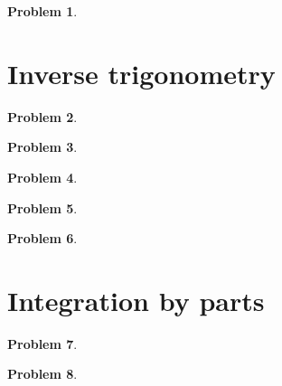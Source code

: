 \documentclass{article}
\newtheorem{problem}{Problem}
\begin{document}
\begin{problem}

\end{problem}
\section{Inverse trigonometry}
\begin{problem}

\end{problem}


\begin{problem}

\end{problem}


\begin{problem}

\end{problem}


\begin{problem}

\end{problem}

\begin{problem}

\end{problem}



\section{Integration by parts}
\begin{problem}

\end{problem}


\begin{problem}

\end{problem}

\end{document}
